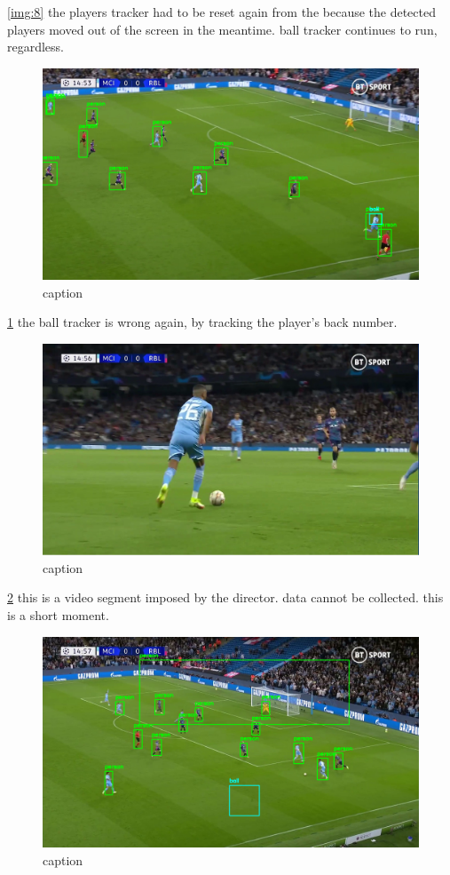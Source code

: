 \documentclass[
11pt,
twoside
]{report}
\begin{document}
\ref{img:8} the
players tracker had to be reset again from the because the detected players moved out of the screen in the meantime. ball tracker continues to run, regardless.
\begin{figure}[H]
    \includegraphics[keepaspectratio, width=\columnwidth]{Screenshot_2022-03-03_23-06-18.png}
    \caption{caption}
    \label{img:9}
\end{figure}
\ref{img:9} the ball
tracker is wrong again, by tracking the player's back number.
\begin{figure}[H]
    \includegraphics[keepaspectratio, width=\columnwidth]{Screenshot_2022-03-03_21-39-53.png}
    \caption{caption}
    \label{img:10}
\end{figure}
\ref{img:10} this is a
video segment imposed by the director. data cannot be collected. this is a short moment.
\begin{figure}[H]
    \includegraphics[keepaspectratio, width=\columnwidth]{Screenshot_2022-03-03_23-06-43.png}
    \caption{caption}
    \label{img:11}
\end{figure}
\end{document}
